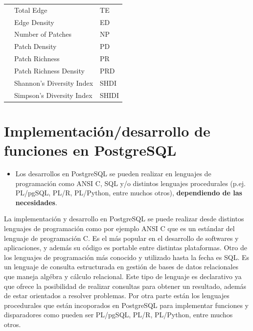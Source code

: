 \begin{table}[]
\begin{tabular}{lll}
                           & Total Edge                           & TE                   \\
                           & Edge Density                         & ED                   \\
                           & Number of Patches                    & NP                   \\
                           & Patch Density                        & PD                   \\
                           & Patch Richness                       & PR                   \\
                           & Patch Richness Density               & PRD                  \\
                           & Shannon's Diversity Index            & SHDI                 \\
                           & Simpson's Diversity Index            & SHIDI                \\ \hline
\end{tabular}
\end{table}


\section{Implementación/desarrollo de funciones en PostgreSQL}

\begin{graybox}
\begin{itemize}
\item Los desarrollos en PostgreSQL se pueden realizar en lenguajes de programación como ANSI C, SQL y/o distintos lenguajes procedurales (p.ej. PL/pgSQL, PL/R, PL/Python, entre muchos otros), \textbf{dependiendo de las necesidades}.
\end{itemize}
\end{graybox}

La implementación y desarrollo en PostgreSQL se puede realizar desde distintos lenguajes de programación como por ejemplo ANSI C que es un estándar del lenguaje de programación C. Es el más popular en el desarrollo de softwares y aplicaciones, y además su código es portable entre distintas plataformas. Otro de los lenguajes de programación más conocido y utilizado hasta la fecha es SQL. Es un lenguaje de consulta estructurada en gestión de bases de datos relacionales que maneja algébra y cálculo relacional. Este tipo de lenguaje es declarativo ya que ofrece la posibilidad de realizar consultas para obtener un resultado, además de estar orientados a resolver problemas. Por otra parte están los lenguajes procedurales que están incoporados en PostgreSQL para implementar funciones y disparadores como pueden ser PL/pgSQL, PL/R, PL/Python, entre muchos otros.


